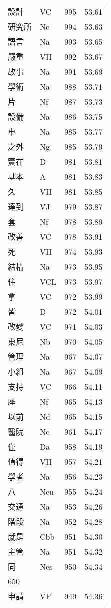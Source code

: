 \documentclass[twocolumn]{book}
\begin{document}
\begin{supertabular}{llrr}
設計 & VC & 995 &  53.61\\
研究所 & Nc & 994 &  53.63\\
語言 & Na & 993 &  53.65\\
嚴重 & VH & 992 &  53.67\\
故事 & Na & 991 &  53.69\\
學術 & Na & 988 &  53.71\\
片 & Nf & 987 &  53.73\\
設備 & Na & 986 &  53.75\\
車 & Na & 985 &  53.77\\
之外 & Ng & 985 &  53.79\\
實在 & D & 981 &  53.81\\
基本 & A & 981 &  53.83\\
久 & VH & 981 &  53.85\\
達到 & VJ & 979 &  53.87\\
套 & Nf & 978 &  53.89\\
改善 & VC & 978 &  53.91\\
死 & VH & 974 &  53.93\\
結構 & Na & 973 &  53.95\\
住 & VCL & 973 &  53.97\\
拿 & VC & 972 &  53.99\\
皆 & D & 972 &  54.01\\
改變 & VC & 971 &  54.03\\
東尼 & Nb & 970 &  54.05\\
管理 & Na & 967 &  54.07\\
小組 & Na & 967 &  54.09\\
支持 & VC & 966 &  54.11\\
座 & Nf & 965 &  54.13\\
以前 & Nd & 965 &  54.15\\
醫院 & Nc & 961 &  54.17\\
僅 & Da & 958 &  54.19\\
值得 & VH & 957 &  54.21\\
學者 & Na & 956 &  54.23\\
八 & Neu & 955 &  54.24\\
交通 & Na & 953 &  54.26\\
階段 & Na & 952 &  54.28\\
就是 & Cbb & 951 &  54.30\\
主管 & Na & 951 &  54.32\\
同 & Nes & 950 &  54.34\\
650\\
申請 & VF & 949 &  54.36\\

\end{supertabular}
\end{document}
